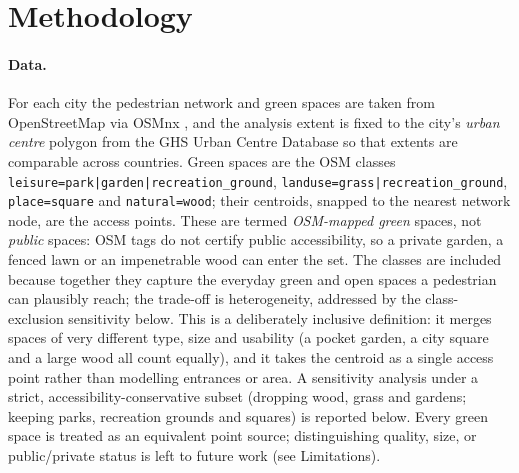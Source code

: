 \section{Methodology}\label{sec:method}
\paragraph{Data.} For each city the pedestrian network and green spaces are taken
from OpenStreetMap via OSMnx \citep{boeing2017osmnx}, and the
analysis extent is fixed to the city's \emph{urban centre} polygon from the GHS Urban
Centre Database \citep{ghsl2019ucdb} so that extents are comparable across
countries. Green spaces are the OSM classes \texttt{leisure=park|garden|recreation\_ground},
\texttt{landuse=grass|recreation\_ground}, \texttt{place=square} and
\texttt{natural=wood}; their centroids, snapped to the nearest network node, are
the access points. These are termed \emph{OSM-mapped green} spaces, not \emph{public}
spaces: OSM tags do not certify public accessibility, so a private garden, a fenced
lawn or an impenetrable wood can enter the set. The classes are included because
together they capture the everyday green and open spaces a pedestrian can plausibly
reach; the trade-off is heterogeneity, addressed by the class-exclusion sensitivity
below. This is a deliberately inclusive definition: it
merges spaces of very different type, size and usability (a pocket garden, a city
square and a large wood all count equally), and it takes the centroid as a single
access point rather than modelling entrances or area. A sensitivity analysis under a
strict, accessibility-conservative subset (dropping wood, grass and gardens; keeping
parks, recreation grounds and squares) is reported below. Every green space is treated
as an equivalent point source; distinguishing quality, size, or public/private status
is left to future work (see Limitations).

